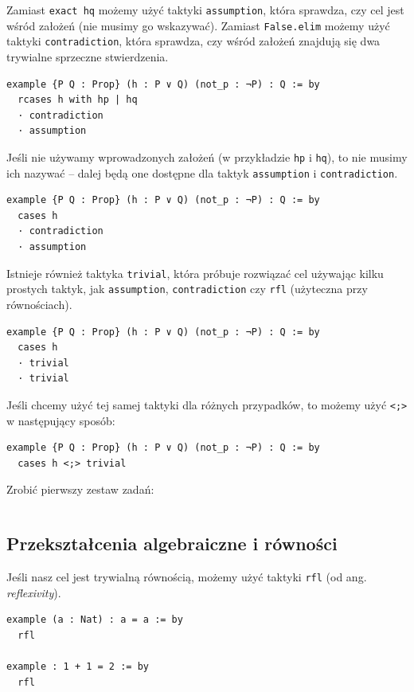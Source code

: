 \documentclass[polish,pretty,bibliography=totocnumbered]{angav}
\newcommand{\Lean}[1]{\texttt{#1}}
\begin{document}
Zamiast \Lean{exact hq} możemy użyć taktyki \Lean{assumption}, która sprawdza, czy cel jest wśród założeń (nie musimy go wskazywać). Zamiast \Lean{False.elim} możemy użyć taktyki \Lean{contradiction}, która sprawdza, czy wśród założeń znajdują się dwa trywialne sprzeczne stwierdzenia.
\begin{verbatim}
example {P Q : Prop} (h : P ∨ Q) (not_p : ¬P) : Q := by
  rcases h with hp | hq
  · contradiction
  · assumption
\end{verbatim}

Jeśli nie używamy wprowadzonych założeń (w przykładzie \Lean{hp} i \Lean{hq}), to nie musimy ich nazywać -- dalej będą one dostępne dla taktyk \Lean{assumption} i \Lean{contradiction}.
\begin{verbatim}
example {P Q : Prop} (h : P ∨ Q) (not_p : ¬P) : Q := by
  cases h
  · contradiction
  · assumption
\end{verbatim}

Istnieje również taktyka \Lean{trivial}, która próbuje rozwiązać cel używając kilku prostych taktyk, jak \Lean{assumption}, \Lean{contradiction} czy \Lean{rfl} (użyteczna przy równościach).
\begin{verbatim}
example {P Q : Prop} (h : P ∨ Q) (not_p : ¬P) : Q := by
  cases h
  · trivial
  · trivial
\end{verbatim}

Jeśli chcemy użyć tej samej taktyki dla różnych przypadków, to możemy użyć \Lean{<;>} w następujący sposób:
\begin{verbatim}
example {P Q : Prop} (h : P ∨ Q) (not_p : ¬P) : Q := by
  cases h <;> trivial
\end{verbatim}

\begin{problem}
    Zrobić pierwszy zestaw zadań:
    \inputminted{lean4}{problemsets/problemset01.lean}
\end{problem}

\subsection{Przekształcenia algebraiczne i równości}

Jeśli nasz cel jest trywialną równością, możemy użyć taktyki \Lean{rfl} (od ang. \textit{reflexivity}).
\begin{verbatim}
example (a : Nat) : a = a := by
  rfl

example : 1 + 1 = 2 := by
  rfl
\end{verbatim}
\end{document}
